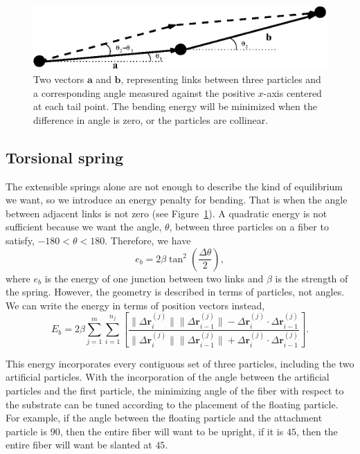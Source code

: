 	\begin{figure}
		\begin{center}
			\includegraphics[scale=1]{./old_fig/BendingEnergy.eps}
		\end{center}		
		\caption{Two vectors $\textbf{a}$ and $\textbf{b}$, representing links between three particles and a corresponding angle measured against the positive $x$-axis centered at each tail point. The bending energy will be minimized when the difference in angle is zero, or the particles are collinear.
		\label{fig:BendingEnergy}}
	\end{figure}	

\subsection{Torsional spring}

	The extensible springs alone are not enough to describe the kind of equilibrium we want, so we introduce an energy penalty for bending. That is when the angle between adjacent links is not zero (see Figure~\ref{fig:BendingEnergy}). A quadratic energy is not sufficient because we want the angle, $\theta$, between three particles on a fiber to satisfy, $-180$\textdegree$ < \theta < 180$\textdegree. Therefore, we have
\begin{equation}
	e_b = 2\beta \tan^2 \left( \frac{\Delta \theta}{2} \right),
\end{equation}
where $e_b$ is the energy of one junction between two links and $\beta$ is the strength of the spring. However, the geometry is described in terms of particles, not angles. We can write the energy in terms of position vectors instead,
\begin{equation}
	E_b = 2\beta \sum_{j=1}^m \sum_{i=1}^{n_j} \left[ \frac{\|\Delta \textbf{r}_i^{(j)} \| \|\Delta \textbf{r}_{i-1}^{(j)} \| - \Delta \textbf{r}_i^{(j)} \cdot \Delta \textbf{r}_{i-1}^{(j)}}{\|\Delta \textbf{r}_i^{(j)} \| \|\Delta \textbf{r}_{i-1}^{(j)} \| + \Delta \textbf{r}_i^{(j)} \cdot \Delta \textbf{r}_{i-1}^{(j)}} \right].
\end{equation}

	This energy incorporates every contiguous set of three particles, including the two artificial particles. With the incorporation of the angle between the artificial particles and the first particle, the minimizing angle of the fiber with respect to the substrate can be tuned according to the placement of the floating particle. For example, if the angle between the floating particle and the attachment particle is $90$\textdegree, then the entire fiber will want to be upright, if it is $45$\textdegree, then the entire fiber will want be slanted at $45$\textdegree. 

